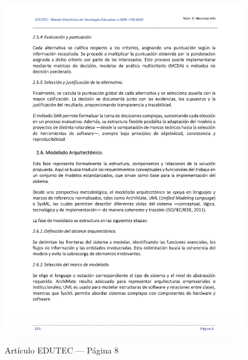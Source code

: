 \begin{figure}[H]
    \centering
    \begin{tcolorbox}[
        colback=white,
        colframe=gray!50,
        boxrule=1pt,
        arc=2pt,
        boxsep=5pt,
        left=3pt,
        right=3pt,
        top=3pt,
        bottom=3pt,
        drop shadow
    ]
        \includegraphics[width=0.95\textwidth,keepaspectratio]{apendices/EDUTEC/8.png}
    \end{tcolorbox}
    \caption{Artículo EDUTEC --- Página 8}\label{fig:edutec-pagina-8}
\end{figure}
\FloatBarrier

